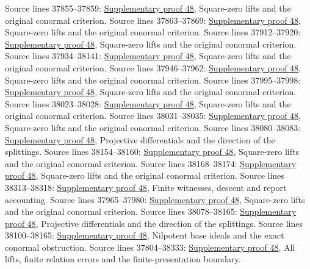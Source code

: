 \begin{AlgebraSourceRoutes}
 Source lines 37855--37859: \hyperlink{algebra_formal_smooth_notes_20260928}{Supplementary proof 48}, Square-zero lifts and the original conormal criterion.
 Source lines 37863--37869: \hyperlink{algebra_formal_smooth_notes_20260928}{Supplementary proof 48}, Square-zero lifts and the original conormal criterion.
 Source lines 37912--37920: \hyperlink{algebra_formal_smooth_notes_20260928}{Supplementary proof 48}, Square-zero lifts and the original conormal criterion.
 Source lines 37934--38141: \hyperlink{algebra_formal_smooth_notes_20260928}{Supplementary proof 48}, Square-zero lifts and the original conormal criterion.
 Source lines 37946--37962: \hyperlink{algebra_formal_smooth_notes_20260928}{Supplementary proof 48}, Square-zero lifts and the original conormal criterion.
 Source lines 37995--37998: \hyperlink{algebra_formal_smooth_notes_20260928}{Supplementary proof 48}, Square-zero lifts and the original conormal criterion.
 Source lines 38023--38028: \hyperlink{algebra_formal_smooth_notes_20260928}{Supplementary proof 48}, Square-zero lifts and the original conormal criterion.
 Source lines 38031--38035: \hyperlink{algebra_formal_smooth_notes_20260928}{Supplementary proof 48}, Square-zero lifts and the original conormal criterion.
 Source lines 38080--38083: \hyperlink{algebra_formal_smooth_notes_20260928}{Supplementary proof 48}, Projective differentials and the direction of the splittings.
 Source lines 38154--38160: \hyperlink{algebra_formal_smooth_notes_20260928}{Supplementary proof 48}, Square-zero lifts and the original conormal criterion.
 Source lines 38168--38174: \hyperlink{algebra_formal_smooth_notes_20260928}{Supplementary proof 48}, Square-zero lifts and the original conormal criterion.
 Source lines 38313--38318: \hyperlink{algebra_formal_smooth_notes_20260928}{Supplementary proof 48}, Finite witnesses, descent and report accounting.
 Source lines 37965--37980: \hyperlink{algebra_formal_smooth_notes_20260928}{Supplementary proof 48}, Square-zero lifts and the original conormal criterion.
 Source lines 38078--38165: \hyperlink{algebra_formal_smooth_notes_20260928}{Supplementary proof 48}, Projective differentials and the direction of the splittings.
 Source lines 38100--38165: \hyperlink{algebra_formal_smooth_notes_20260928}{Supplementary proof 48}, Nilpotent base ideals and the exact conormal obstruction.
 Source lines 37804--38333: \hyperlink{algebra_formal_smooth_notes_20260928}{Supplementary proof 48}, All lifts, finite relation errors and the finite-presentation boundary.
\end{AlgebraSourceRoutes}


